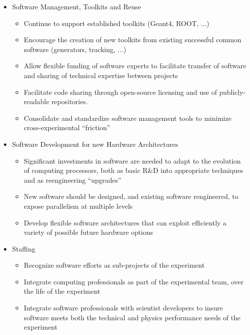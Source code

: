 \begin{itemize}
    \item Software Management, Toolkits and Reuse
    \begin{itemize}
        \item Continue to support established toolkits (Geant4, ROOT, ...)
        \item Encourage the creation of new toolkits from existing successful common software (generators, tracking, ...)
        \item  Allow flexible funding of software experts to facilitate transfer of software and sharing of technical expertise between projects
        \item Facilitate code sharing through open-source licensing and use of publicly-readable repositories.
        \item Consolidate and standardize software management tools to minimize cross-experimental ``friction''
    \end{itemize}

    \item Software Development for new Hardware Architectures
    \begin{itemize}
        \item Significant investments in software are needed to adapt to the evolution of computing processors, both as basic R\&D into appropriate
techniques and as reengineering ``upgrades''
        \item New software should be designed, and existing software rengineered, to expose parallelism at multiple levels
        \item Develop flexible software architectures that can exploit efficiently a variety of possible future hardware options
    \end{itemize}    

    \item Staffing
      \begin{itemize}
          \item Recognize software efforts as sub-projects of the experiment
          \item Integrate computing professionals as part of the experimental team, over the life of the experiment
          \item Integrate software professionals with scientist developers to insure software meets both the technical and physics performance needs of the experiment
      \end{itemize}


\end{itemize}
